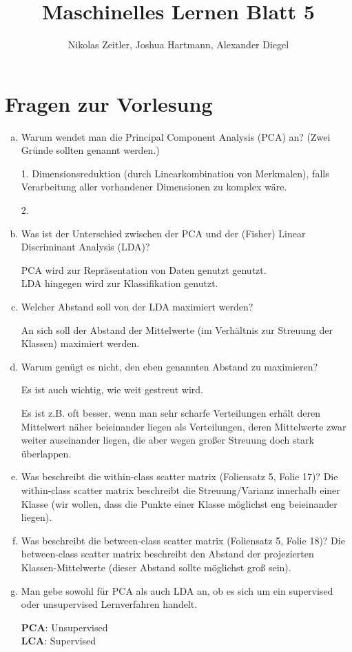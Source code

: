 \documentclass[a4paper]{scrartcl}
\author{Nikolas Zeitler, Joshua Hartmann, Alexander Diegel}
\title{Maschinelles Lernen Blatt 5}
\begin{document}
\maketitle
\section{Fragen zur Vorlesung}

\begin{enumerate}[a)]
	\item Warum wendet man die Principal Component Analysis (PCA) an? (Zwei Gründe sollten genannt werden.)
	
	1. Dimensionsreduktion (durch Linearkombination von Merkmalen), falls Verarbeitung aller vorhandener Dimensionen zu komplex wäre.
	
	2. 
	
	\item Was ist der Unterschied zwischen der PCA und der (Fisher) Linear Discriminant Analysis (LDA)?
	
	PCA wird zur Repräsentation von Daten genutzt genutzt.\\
	LDA hingegen wird zur Klassifikation genutzt.
	
	\item Welcher Abstand soll von der LDA maximiert werden?
	
	An sich soll der Abstand der Mittelwerte (im Verhältnis zur Streuung der Klassen) maximiert werden.
	
	\item Warum genügt es nicht, den eben genannten Abstand zu maximieren?
	
	Es ist auch wichtig, wie weit gestreut wird.
	
	Es ist z.B.  oft besser, wenn man sehr scharfe Verteilungen erhält deren Mittelwert näher beieinander liegen als Verteilungen, deren Mittelwerte zwar weiter auseinander liegen, die aber wegen großer Streuung doch stark überlappen.
	
	\item Was beschreibt die within-class scatter matrix (Foliensatz 5, Folie 17)?
	Die within-class scatter matrix beschreibt die Streuung/Varianz innerhalb einer Klasse (wir wollen, dass die Punkte einer Klasse möglichst eng beieinander liegen).
	
	\item Was beschreibt die between-class scatter matrix (Foliensatz 5, Folie 18)?
	Die between-class scatter matrix beschreibt den Abstand der projezierten Klassen-Mittelwerte (dieser Abstand sollte möglichst groß sein).
	
	\item Man gebe sowohl für PCA als auch LDA an, ob es sich um ein supervised oder unsupervised Lernverfahren
	handelt.
	
	\textbf{PCA}: Unsupervised\\
	\textbf{LCA}: Supervised
	
\end{enumerate}
\end{document}
